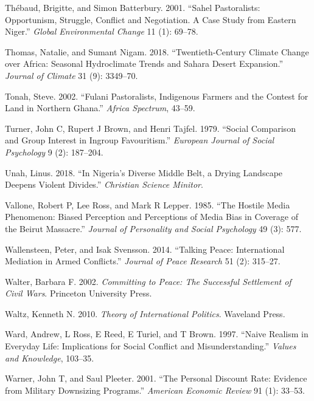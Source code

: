 \documentclass[11pt]{article}
\begin{document}
\leavevmode\hypertarget{ref-thebaud2001sahel}{}%
Thébaud, Brigitte, and Simon Batterbury. 2001. ``Sahel Pastoralists:
Opportunism, Struggle, Conflict and Negotiation. A Case Study from
Eastern Niger.'' \emph{Global Environmental Change} 11 (1): 69--78.

\leavevmode\hypertarget{ref-thomas2018sahara}{}%
Thomas, Natalie, and Sumant Nigam. 2018. ``Twentieth-Century Climate
Change over Africa: Seasonal Hydroclimate Trends and Sahara Desert
Expansion.'' \emph{Journal of Climate} 31 (9): 3349--70.

\leavevmode\hypertarget{ref-tonah2002fulani}{}%
Tonah, Steve. 2002. ``Fulani Pastoralists, Indigenous Farmers and the
Contest for Land in Northern Ghana.'' \emph{Africa Spectrum}, 43--59.

\leavevmode\hypertarget{ref-turner1979social}{}%
Turner, John C, Rupert J Brown, and Henri Tajfel. 1979. ``Social
Comparison and Group Interest in Ingroup Favouritism.'' \emph{European
Journal of Social Psychology} 9 (2): 187--204.

\leavevmode\hypertarget{ref-unah2018nigeria}{}%
Unah, Linus. 2018. ``In Nigeria's Diverse Middle Belt, a Drying
Landscape Deepens Violent Divides.'' \emph{Christian Science Minitor}.

\leavevmode\hypertarget{ref-vallone1985hostileMedia}{}%
Vallone, Robert P, Lee Ross, and Mark R Lepper. 1985. ``The Hostile
Media Phenomenon: Biased Perception and Perceptions of Media Bias in
Coverage of the Beirut Massacre.'' \emph{Journal of Personality and
Social Psychology} 49 (3): 577.

\leavevmode\hypertarget{ref-wallensteen2014talking}{}%
Wallensteen, Peter, and Isak Svensson. 2014. ``Talking Peace:
International Mediation in Armed Conflicts.'' \emph{Journal of Peace
Research} 51 (2): 315--27.

\leavevmode\hypertarget{ref-walter2002committing}{}%
Walter, Barbara F. 2002. \emph{Committing to Peace: The Successful
Settlement of Civil Wars}. Princeton University Press.

\leavevmode\hypertarget{ref-waltz2010theory}{}%
Waltz, Kenneth N. 2010. \emph{Theory of International Politics}.
Waveland Press.

\leavevmode\hypertarget{ref-ward1997naive}{}%
Ward, Andrew, L Ross, E Reed, E Turiel, and T Brown. 1997. ``Naive
Realism in Everyday Life: Implications for Social Conflict and
Misunderstanding.'' \emph{Values and Knowledge}, 103--35.

\leavevmode\hypertarget{ref-warner2001personal}{}%
Warner, John T, and Saul Pleeter. 2001. ``The Personal Discount Rate:
Evidence from Military Downsizing Programs.'' \emph{American Economic
Review} 91 (1): 33--53.
\end{document}
